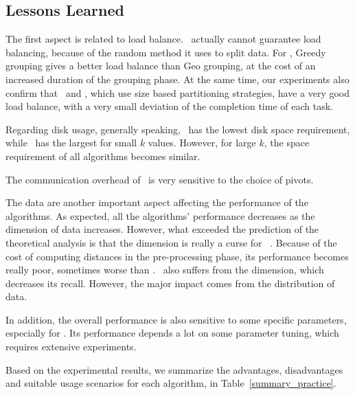 \subsection{Lessons Learned}

The first aspect is related to load balance. \HBNLJ~actually cannot guarantee load balancing, because of the random 
method it uses to split data. For \VO, Greedy grouping gives a better load balance than Geo grouping, at 
the cost of an increased duration of the grouping phase. At 
the same time, our experiments also confirm that \Z~and \LSH, which use size based 
partitioning strategies, have a very good load balance, with a very small deviation of the completion time of each 
task. %

Regarding disk usage, generally speaking, \VO~has the lowest disk space requirement, while \Z~has the largest for small
$k$ values. However, for large $k$, the space requirement of all algorithms becomes similar. 

The communication overhead of \VO~is very sensitive to the choice of pivots. 

The data are another important aspect affecting the performance of the algorithms. As expected, all the 
algorithms' performance decreases as the dimension of data increases. However, what exceeded the prediction of the 
theoretical analysis is that the dimension is really a curse for \VO~. Because of the cost of computing distances in 
the pre-processing phase, its performance becomes really poor, sometimes worse than \HBNLJ. \Z~also suffers from the 
dimension, which decreases its recall. However, the major impact comes from the distribution of data. 

In addition, the overall performance is also sensitive to some specific parameters, especially for \LSH. Its 
performance depends a lot on some parameter tuning, which requires extensive experiments.

Based on the experimental results, we summarize the advantages, disadvantages and suitable usage scenarios for each 
algorithm, in Table~\ref{summary_practice}.


 